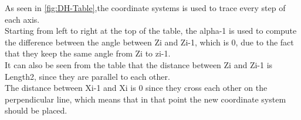 As seen in \ref{fig:DH-Table},the coordinate systems is used to trace every step of each axis.\\
Starting from left to right at the top of the table, the alpha-1 is used to compute the difference between the angle between Zi and Zi-1, which is 0, due to the fact that they keep the same angle from Zi to zi-1.\\
It can also be seen from the table that the distance between Zi and Zi-1 is Length2, since they are parallel to each other.\\ 
The distance between Xi-1 and Xi is 0 since they cross each other on the perpendicular line, which means that in that point the new coordinate system should be placed.\\

